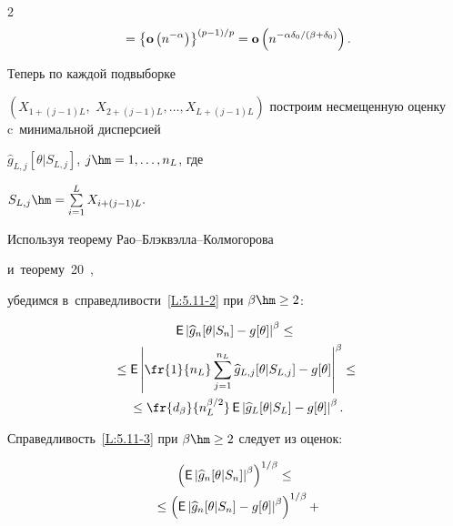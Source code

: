 \begin{multicols}{2}
\begin{multline*}
 {}= \left\{\op\left(n^{-\alpha}\right)\right\}^{(p-1)/p}=


 \op\left(n^{-\alpha\delta_0/(\beta+\delta_0)}\right).


 \end{multline*}





 Теперь по каждой подвыборке


 $\left(X_{1+(j-1)L},\right.$ $\left.X_{2+(j-1)L},\ldots,X_{L+(j-1)L}\right)$ построим несмещенную оценку c~минимальной дисперсией


 $\widehat{g}_{L,j}[\theta|S_{L,j}]$, $j\hm=1,\ldots,n_L$, где


 $S_{L,j}\hm=\sum\limits_{i=1}^L X_{i+(j-1)L}.$


 Используя теорему Рао--Блэк\-вэл\-ла--Кол\-мо\-го\-ро\-ва


 и~теорему~20~\cite[с.~89]{17-ch},


 убедимся в~справедливости~\eqref{L:5.11-2} при $\beta\hm\ge 2$:


 \begin{multline*}


\Ep \left|\widehat{g}_n[\theta|S_n]-g[\theta] \right|^{\beta}\le{}\\


{}\le


 \Ep \left|\fr{1}{n_L} \sum\limits_{j=1}^{n_L} \widehat{g}_{L,j}[\theta|S_{L,j}]


 -g[\theta] \right|^{\beta}\le{}


\\


 {}\le


 \fr{d_\beta}{n_L^{\beta/2}} \,


 \Ep \left|\widehat{g}_L[\theta|S_L]-g[\theta] \right|^{\beta}.


 \end{multline*}





 Справедливость~\eqref{L:5.11-3} при $\beta\hm\ge 2$ следует из оценок:


  \begin{multline*}


  \left(\Ep \left|\widehat{g}_n[\theta|S_n]\right|^{\beta}\right)^{1/\beta}\le{}\\


  {}\le


 \left(\Ep \left|\widehat{g}_n[\theta|S_n]-g[\theta]\right|^{\beta}\right)^{1/\beta}+



\end{multline*}
\end{multicols}
